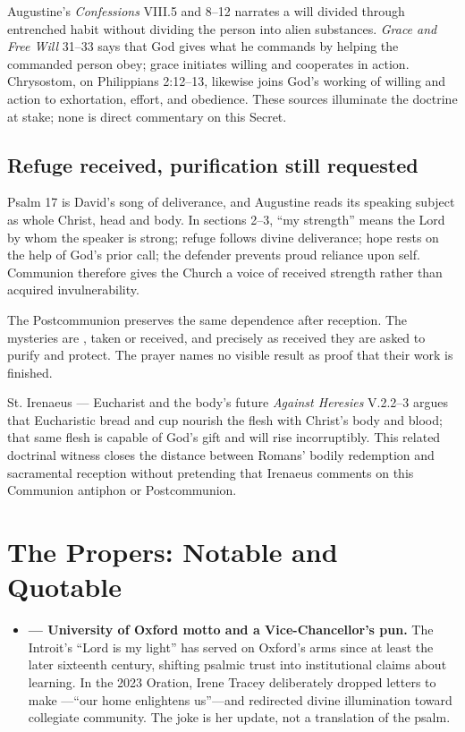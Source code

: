\begin{deepstudy}
Augustine's \emph{Confessions} VIII.5 and 8--12 narrates a will divided through entrenched habit without dividing the person into alien substances. \emph{Grace and Free Will} 31--33 says that God gives what he commands by helping the commanded person obey; grace initiates willing and cooperates in action. Chrysostom, on Philippians 2:12--13, likewise joins God's working of willing and action to exhortation, effort, and obedience. These sources illuminate the doctrine at stake; none is direct commentary on this Secret.

\sectionguard
\subsection*{Refuge received, purification still requested\enspace{}}

Psalm 17 is David's song of deliverance, and Augustine reads its speaking subject as whole Christ, head and body. In sections 2--3, ``my strength'' means the Lord by whom the speaker is strong; refuge follows divine deliverance; hope rests on the help of God's prior call; the defender prevents proud reliance upon self. Communion therefore gives the Church a voice of received strength rather than acquired invulnerability.

The Postcommunion preserves the same dependence after reception. The mysteries are , taken or received, and precisely as received they are asked to purify and protect. The prayer names no visible result as proof that their work is finished.

\begin{sourcecard}{St. Irenaeus --- Eucharist and the body's future}
\emph{Against Heresies} V.2.2--3 argues that Eucharistic bread and cup nourish the flesh with Christ's body and blood; that same flesh is capable of God's gift and will rise incorruptibly. This related doctrinal witness closes the distance between Romans' bodily redemption and sacramental reception without pretending that Irenaeus comments on this Communion antiphon or Postcommunion.
\end{sourcecard}

\sectionguard
\section*{The Propers: Notable and Quotable}

{\small
\begin{itemize}[itemsep=0.35em,topsep=0.2em,parsep=0pt]
\item \textbf{ --- University of Oxford motto and a Vice-Chancellor's pun.} The Introit's ``Lord is my light'' has served on Oxford's arms since at least the later sixteenth century, shifting psalmic trust into institutional claims about learning. In the 2023 Oration, Irene Tracey deliberately dropped letters to make ---``our home enlightens us''---and redirected divine illumination toward collegiate community. The joke is her update, not a translation of the psalm.


\end{itemize}}
\end{deepstudy}
